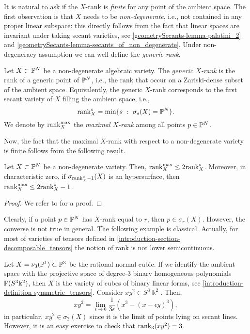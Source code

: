  It is natural to ask if the $X$-rank is \emph{finite} for any point of the ambient space. The first observation is that $X$ needs to be \emph{non-degenerate}, i.e., not contained in any proper linear subspace: this directly follows from the fact that linear spaces are invariant under taking secant varieties, see \ref{geometrySecants-lemma-palatini_2} and \ref{geometrySecants-lemma-secants_of_non_degenerate}. Under non-degeneracy assumption we can well-define the \emph{generic rank}.
 
 \begin{definition}
     \label{geometrySecants-definition-generic_rank}
     Let $X \subset \mathbb{P}^N$ be a non-degenerate algebraic variety. The \emph{generic $X$-rank} is the rank of a generic point of $\mathbb{P}^N$, i.e., the rank that occur on a Zariski-dense subset of the ambient space. Equivalently, the generic $X$-rank corresponds to the first secant variety of $X$ filling the ambient space, i.e., 
     \[
         \mathrm{rank}_X^\circ = \min\{s ~:~ \sigma_s(X) = \mathbb{P}^N\}.
     \]
     We denote by $\mathrm{rank}_X^{\max}$ the \emph{maximal $X$-rank} among all points $p \in \mathbb{P}^N$. 
 \end{definition}
 Now, the fact that the maximal $X$-rank with respect to a non-degenerate variety is finite follows from the following result. 
 
 \begin{theorem}
     Let $X \subset \mathbb{P}^N$ be a non-degenerate variety. Then, $\mathrm{rank}_X^{\max} \leq 2\mathrm{rank}_X^\circ$. Moreover, in characteristic zero, if $\sigma_{\mathrm{rank}^\circ_X-1}(X)$ is an hypersurface, then $\mathrm{rank}_X^{\max} \leq 2\mathrm{rank}_X^\circ-1$.
 \end{theorem}
 \begin{proof}
  We refer to \cite[Theorem 1]{BT15} for a proof.
 \end{proof}

  Clearly, if a point $p \in \mathbb{P}^N$ has $X$-rank equal to $r$, then $p \in \sigma_r(X)$. However, the converse is not true in general. The following example is classical. Actually, for most of varieties of tensors defined in \ref{introduction-section-decomposable_tensors} the notion of rank is not lower semicontinuous.
 
 \begin{example}
 \label{geometrySecants-example-Xrank_semicontinuous}
   Let $X = \nu_3(\mathbb{P}^1) \subset \mathbb{P}^3$ be the rational normal cubic. If we identify the ambient space with the projective space of degree-$3$ binary homogeneous polynomials $\mathbb{P}(S^3\Bbbk^2)$, then $X$ is the variety of cubes of binary linear forms, see \ref{introduction-definition-symmetric_tensors}. Consider $xy^2 \in S^3\Bbbk^2$. Then, 
   \[
      xy^2 = \lim_{\epsilon \to 0} \frac{1}{3\epsilon}\left( x^3 - (x-\epsilon y)^3\right),
 \]
  in particular, $xy^2 \in \sigma_2(X)$ since it is the limit of points lying on secant lines. However, it is an easy exercise to check that $\mathrm{rank}_3(xy^2) = 3$. 
 \end{example}
 
